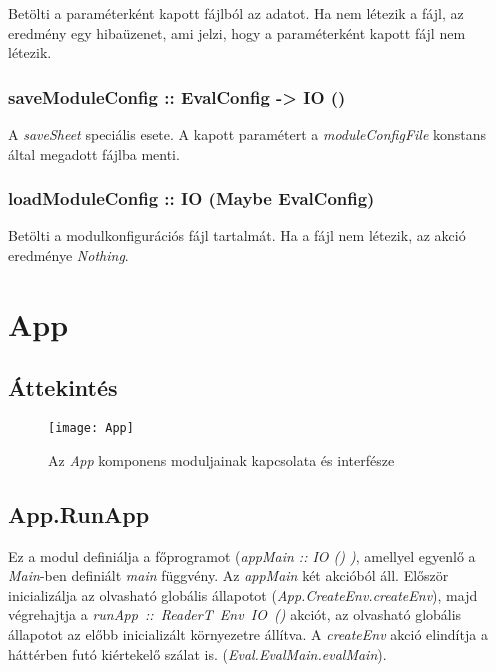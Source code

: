 Betölti a paraméterként kapott fájlból az adatot. Ha nem létezik a fájl, az eredmény egy hibaüzenet, ami jelzi, hogy a paraméterként kapott fájl nem létezik.

\subsubsection{saveModuleConfig :: EvalConfig -> IO ()}

A \textit{saveSheet} speciális esete. A kapott paramétert a \textit{moduleConfigFile} konstans által megadott fájlba menti.

\subsubsection{loadModuleConfig :: IO (Maybe EvalConfig)}

Betölti a modulkonfigurációs fájl tartalmát. Ha a fájl nem létezik, az akció eredménye \textit{Nothing}.

\section{App}

\subsection{Áttekintés}

\begin{figure}[H]
	\centering
	\texttt{[image: App]}
	\caption{Az \textit{App} komponens moduljainak kapcsolata és interfésze}
	\label{fig:appstructure}
\end{figure}

\subsection{App.RunApp}

Ez a modul definiálja a főprogramot (\textit{appMain :: IO () )}, amellyel egyenlő a \textit{Main}-ben definiált \textit{main} függvény. Az \textit{appMain} két akcióból áll. Először inicializálja az olvasható globális állapotot (\textit{App.CreateEnv.createEnv}), majd végrehajtja a \mbox{\textit{runApp :: ReaderT Env IO ()}} akciót, az olvasható globális állapotot az előbb inicializált környezetre állítva. A 
\textit{createEnv} akció elindítja a háttérben futó kiértekelő szálat is. (\textit{Eval.EvalMain.evalMain}).

